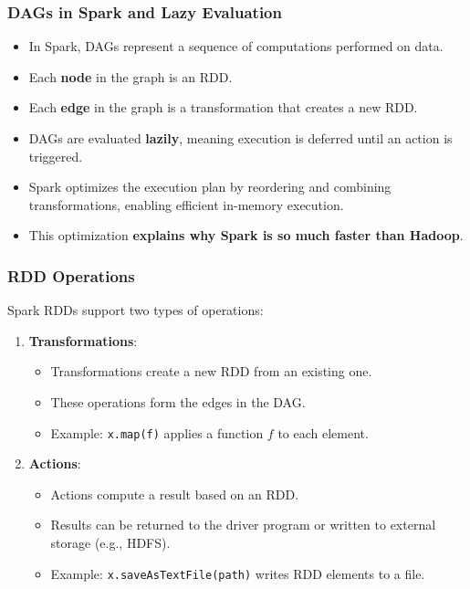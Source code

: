 \documentclass[12pt]{article}
\begin{document}
\subsubsection{DAGs in Spark and Lazy Evaluation}
\begin{itemize}
    \item In Spark, DAGs represent a sequence of computations performed on data.
    \item Each \textbf{node} in the graph is an RDD.
    \item Each \textbf{edge} in the graph is a transformation that creates a new RDD.
    \item DAGs are evaluated \textbf{lazily}, meaning execution is deferred until an action is triggered.
    \item Spark optimizes the execution plan by reordering and combining transformations, enabling efficient in-memory execution.
    \item This optimization \textbf{explains why Spark is so much faster than Hadoop}.
\end{itemize}

\subsubsection{RDD Operations}
Spark RDDs support two types of operations:
\begin{enumerate}
    \item \textbf{Transformations}:
    \begin{itemize}
        \item Transformations create a new RDD from an existing one.
        \item These operations form the edges in the DAG.
        \item Example: \texttt{x.map(f)} applies a function \( f \) to each element.
    \end{itemize}
    \item \textbf{Actions}:
    \begin{itemize}
        \item Actions compute a result based on an RDD.
        \item Results can be returned to the driver program or written to external storage (e.g., HDFS).
        \item Example: \texttt{x.saveAsTextFile(path)} writes RDD elements to a file.
    \end{itemize}
\end{enumerate}
\end{document}
